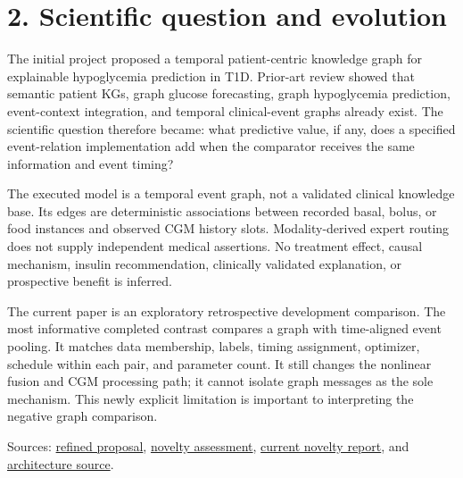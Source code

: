 \documentclass[11pt,a4paper]{article}
\begin{document}
\section*{2. Scientific question and evolution}
The initial project proposed a temporal patient-centric knowledge graph for explainable hypoglycemia prediction in T1D. Prior-art review showed that semantic patient KGs, graph glucose forecasting, graph hypoglycemia prediction, event-context integration, and temporal clinical-event graphs already exist. The scientific question therefore became: what predictive value, if any, does a specified event-relation implementation add when the comparator receives the same information and event timing?

The executed model is a temporal event graph, not a validated clinical knowledge base. Its edges are deterministic associations between recorded basal, bolus, or food instances and observed CGM history slots. Modality-derived expert routing does not supply independent medical assertions. No treatment effect, causal mechanism, insulin recommendation, clinically validated explanation, or prospective benefit is inferred.

The current paper is an exploratory retrospective development comparison. The most informative completed contrast compares a graph with time-aligned event pooling. It matches data membership, labels, timing assignment, optimizer, schedule within each pair, and parameter count. It still changes the nonlinear fusion and CGM processing path; it cannot isolate graph messages as the sole mechanism. This newly explicit limitation is important to interpreting the negative graph comparison.

Sources: \href{refined_proposal.md}{refined proposal}, \href{novelty_assessment.md}{novelty assessment}, \href{novelty_evidence_report_2026_10_31.md}{current novelty report}, and \href{../kaggle_event_sequence_gru/train_history_relations.py}{architecture source}.
\end{document}
